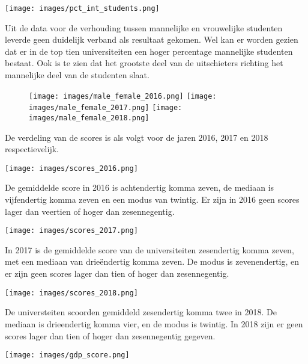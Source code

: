 \documentclass{uva-inf-article}
\begin{document}
\begin{center}
\texttt{[image: images/pct\_int\_students.png]}
\end{center}


Uit de data voor de verhouding tussen mannelijke en vrouwelijke studenten leverde geen duidelijk verband als resultaat gekomen. Wel kan er worden gezien dat er in de top tien universiteiten een hoger percentage mannelijke studenten bestaat. Ook is te zien dat het grootste deel van de uitschieters richting het mannelijke deel van de studenten slaat. 
\begin{figure}
\texttt{[image: images/male\_female\_2016.png]}
\texttt{[image: images/male\_female\_2017.png]}
\texttt{[image: images/male\_female\_2018.png]}
\end{figure}
\newpage

De verdeling van de scores is als volgt voor de jaren 2016, 2017 en 2018 respectievelijk.

\begin{center}

\texttt{[image: images/scores\_2016.png]}

\end{center}
De gemiddelde score in 2016 is achtendertig komma zeven, de mediaan is vijfendertig komma zeven en een modus van twintig. Er zijn in 2016 geen scores lager dan veertien of hoger dan zesennegentig.  


\begin{center}
    
\texttt{[image: images/scores\_2017.png]}

    
\end{center}

In 2017 is de gemiddelde score van de universiteiten zesendertig komma zeven, met een mediaan van drieëndertig komma zeven. De modus is zevenendertig, en er zijn geen scores lager dan tien of hoger dan zesennegentig.
\begin{center}

\texttt{[image: images/scores\_2018.png]}

\end{center}

De universteiten scoorden gemiddeld zesendertig komma twee in 2018. De mediaan is drieendertig komma vier, en de modus is twintig. In 2018 zijn er geen scores lager dan tien of hoger dan zesennegentig gegeven. 

\begin{center}
\texttt{[image: images/gdp\_score.png]}
\end{center}
\end{document}
